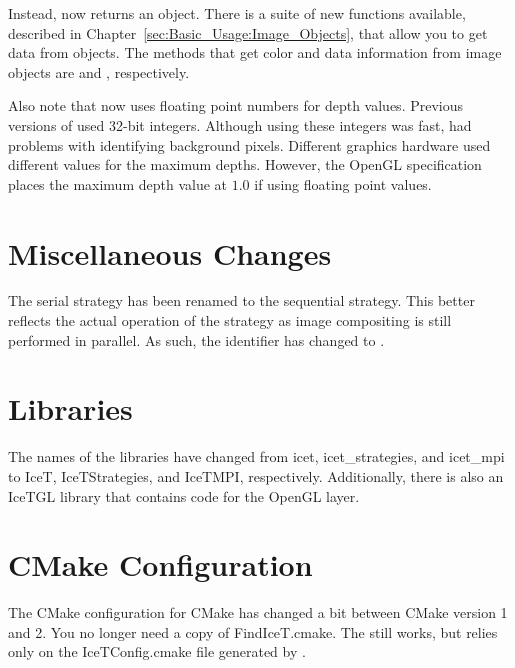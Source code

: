 Instead,  now returns an  object.
There is a suite of new functions available, described in
Chapter~\ref{sec:Basic_Usage:Image_Objects}, that allow you to get data
from  objects.  The methods that get color and data
information from image objects are  and
, respectively.

Also note that \IceT now uses floating point numbers for depth values.
Previous versions of \IceT used 32-bit integers.  Although using these
integers was fast, \IceT had problems with identifying background pixels.
Different graphics hardware used different values for the maximum depths.
However, the OpenGL specification places the maximum depth value at $1.0$
if using floating point values.

\section{Miscellaneous Changes}
\label{sec:Transitioning:Miscellaneous}

The serial strategy has been renamed to the sequential strategy.  This
better reflects the actual operation of the strategy as image compositing
is still performed in parallel.  As such, the
 identifier has changed to
.

\section{Libraries}
\label{sec:Transitioning:Libraries}

The names of the libraries have changed from icet,
icet\_strategies, and
icet\_mpi to IceT,
IceTStrategies, and
IceTMPI, respectively.  Additionally, there is
also an IceTGL library that contains code for
the OpenGL layer.

\section{CMake Configuration}
\label{sec:Transitioning:CMake_Configuration}

The CMake configuration for CMake has changed a bit between
CMake version 1 and 2.  You no longer need a copy of
FindIceT.cmake.  The 
still works, but relies only on the
IceTConfig.cmake file generated by \IceT.

